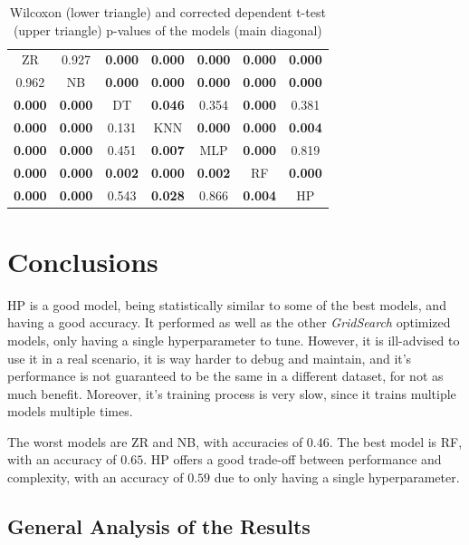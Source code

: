 \documentclass[review]{elsarticle}
\begin{document}
\begin{table}[h]
    \centering
    \begin{tabular}{|c|c|c|c|c|c|c|}
        \hline
        ZR & 0.927 & \textbf{0.000} & \textbf{0.000} & \textbf{0.000} & \textbf{0.000} & \textbf{0.000} \\
        0.962 & NB & \textbf{0.000} & \textbf{0.000} & \textbf{0.000} & \textbf{0.000} & \textbf{0.000} \\
        \textbf{0.000} & \textbf{0.000} & DT & \textbf{0.046} & 0.354 & \textbf{0.000} & 0.381 \\
        \textbf{0.000} & \textbf{0.000} & 0.131 & KNN & \textbf{0.000} & \textbf{0.000} & \textbf{0.004} \\
        \textbf{0.000} & \textbf{0.000} & 0.451 & \textbf{0.007} & MLP & \textbf{0.000} & 0.819 \\
        \textbf{0.000} & \textbf{0.000} & \textbf{0.002} & \textbf{0.000} & \textbf{0.002} & RF & \textbf{0.000} \\
        \textbf{0.000} & \textbf{0.000} & 0.543 & \textbf{0.028} & 0.866 & \textbf{0.004} & HP \\
        \hline
    \end{tabular}
    \caption{Wilcoxon (lower triangle) and corrected dependent t-test (upper triangle) p-values of the models (main diagonal)}
    \label{tab:p_values}
\end{table}


\section{Conclusions}

HP is a good model, being statistically similar to some of the best models, and having a good accuracy. 
It performed as well as the other \emph{GridSearch} optimized models, only having a single hyperparameter to tune.
However, it is ill-advised to use it in a real scenario, it is way harder to debug and maintain, and it's performance is not guaranteed to be the same in a different dataset, for not as much benefit. Moreover, it's training process is very slow, since it trains multiple models multiple times.

The worst models are ZR and NB, with accuracies of $0.46$. The best model is RF, with an accuracy of $0.65$. HP offers a good trade-off between performance and complexity, with an accuracy of $0.59$ due to only having a single hyperparameter.


\subsection{General Analysis of the Results}
\end{document}
